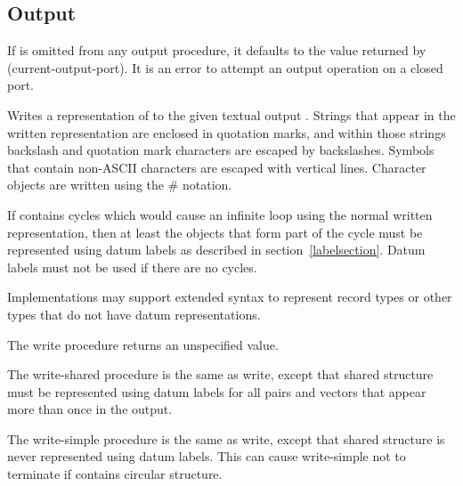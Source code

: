 \subsection{Output}
\label{outputsection}

If  is omitted from any output procedure, it defaults to the
value returned by {\cf (current-output-port)}.
It is an error to attempt an output operation on a closed port.

\noindent \hbox{}
\vspace{-5ex}

\begin{entry}{
}

Writes a representation of  to the given textual output
.  Strings
that appear in the written representation are enclosed in quotation marks, and
within those strings backslash and quotation mark characters are
escaped by backslashes.  Symbols that contain non-ASCII characters
are escaped with vertical lines.
Character objects are written using the {\cf \#\backwhack} notation.

If  contains cycles which would cause an infinite loop using
the normal written representation, then at least the objects that form
part of the cycle must be represented using datum labels as described
in section~\ref{labelsection}.  Datum labels must not be used if there
are no cycles.

Implementations may support extended syntax to represent record types or
other types that do not have datum representations.

The {\cf write} procedure returns an unspecified value.

\end{entry}

\begin{entry}{
}

The {\cf write-shared} procedure is the same as {\cf write}, except that
shared structure must be represented using datum labels for all pairs
and vectors that appear more than once in the output.

\end{entry}

\begin{entry}{
}

The {\cf write-simple} procedure is the same as {\cf write}, except that shared structure is
never represented using datum labels.  This can cause {\cf write-simple} not to
terminate if  contains circular structure.

\end{entry}


